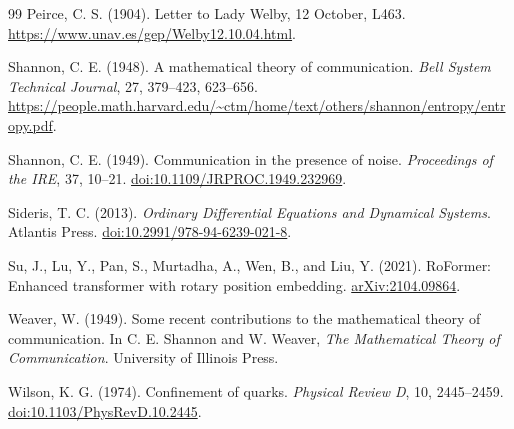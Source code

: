 \documentclass[11pt,a4paper]{article}
\begin{document}
\begin{thebibliography}{99}
Peirce, C. S. (1904). Letter to Lady Welby, 12 October, L463.
\url{https://www.unav.es/gep/Welby12.10.04.html}.

Shannon, C. E. (1948). A mathematical theory of communication.
\emph{Bell System Technical Journal}, 27, 379--423, 623--656.
\url{https://people.math.harvard.edu/~ctm/home/text/others/shannon/entropy/entropy.pdf}.

Shannon, C. E. (1949). Communication in the presence of noise.
\emph{Proceedings of the IRE}, 37, 10--21.
\href{https://doi.org/10.1109/JRPROC.1949.232969}{doi:10.1109/JRPROC.1949.232969}.

Sideris, T. C. (2013). \emph{Ordinary Differential Equations and Dynamical Systems}.
Atlantis Press. \href{https://doi.org/10.2991/978-94-6239-021-8}{doi:10.2991/978-94-6239-021-8}.

Su, J., Lu, Y., Pan, S., Murtadha, A., Wen, B., and Liu, Y. (2021).
RoFormer: Enhanced transformer with rotary position embedding.
\href{https://arxiv.org/abs/2104.09864}{arXiv:2104.09864}.

Weaver, W. (1949). Some recent contributions to the mathematical theory of
communication. In C. E. Shannon and W. Weaver,
\emph{The Mathematical Theory of Communication}. University of Illinois Press.

Wilson, K. G. (1974). Confinement of quarks.
\emph{Physical Review D}, 10, 2445--2459.
\href{https://doi.org/10.1103/PhysRevD.10.2445}{doi:10.1103/PhysRevD.10.2445}.
\end{thebibliography}
\end{document}
